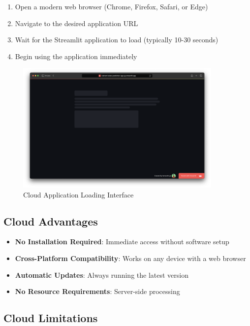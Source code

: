 \begin{enumerate}
    \item Open a modern web browser (Chrome, Firefox, Safari, or Edge)
    \item Navigate to the desired application URL
    \item Wait for the Streamlit application to load (typically 10-30 seconds)
    \item Begin using the application immediately
\end{enumerate}

\begin{figure}[H]
    \centering
    \includegraphics[width=0.9\textwidth]{Images/02InstallationAndSetup/CloudAccess.png}
    \caption{Cloud Application Loading Interface}
    \label{fig:cloud_access}
\end{figure}

\subsection{Cloud Advantages}

\begin{itemize}
    \item \textbf{No Installation Required}: Immediate access without software setup
    \item \textbf{Cross-Platform Compatibility}: Works on any device with a web browser
    \item \textbf{Automatic Updates}: Always running the latest version
    \item \textbf{No Resource Requirements}: Server-side processing
\end{itemize}

\subsection{Cloud Limitations}

